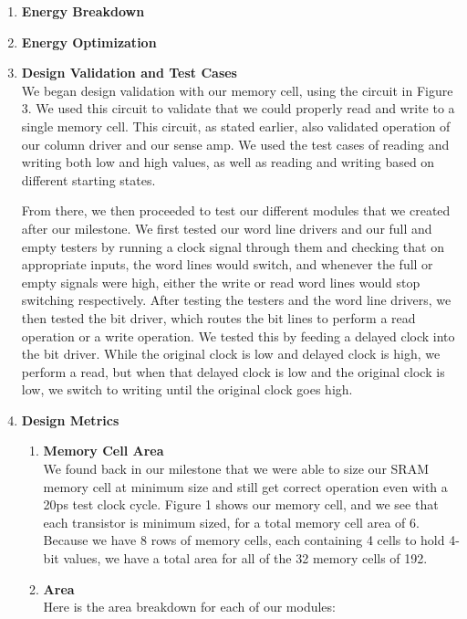 \documentclass[11pt]{article}
\theoremstyle{definition}
\begin{document}
\begin{enumerate}
\item \textbf{Energy Breakdown}\\

\item \textbf{Energy Optimization}\\

\item \textbf{Design Validation and Test Cases}\\
We began design validation with our memory cell, using the circuit in Figure 3. We used this circuit to validate that we could properly read and write to a single memory cell. This circuit, as stated earlier, also validated operation of our column driver and our sense amp. We used the test cases of reading and writing both low and high values, as well as reading and writing based on different starting states. 

From there, we then proceeded to test our different modules that we created after our milestone. We first tested our word line drivers and our full and empty testers by running a clock signal through them and checking that on appropriate inputs, the word lines would switch, and whenever the full or empty signals were high, either the write or read word lines would stop switching respectively. After testing the testers and the word line drivers, we then tested the bit driver, which routes the bit lines to perform a read operation or a write operation. We tested this by feeding a delayed clock into the bit driver. While the original clock is low and delayed clock is high, we perform a read, but when that delayed clock is low and the original clock is low, we switch to writing until the original clock goes high.

\item \textbf{Design Metrics}\\

\begin{enumerate}

\item \textbf{Memory Cell Area}\\
We found back in our milestone that we were able to size our SRAM memory cell at minimum size and still get correct operation even with a 20ps test clock cycle. Figure 1 shows our memory cell, and we see that each transistor is minimum sized, for a total memory cell area of 6. Because we have 8 rows of memory cells, each containing 4 cells to hold 4-bit values, we have a total area for all of the 32 memory cells of 192. 

\item \textbf{Area}\\
Here is the area breakdown for each of our modules:


\end{enumerate}
\end{enumerate}
\end{document}
